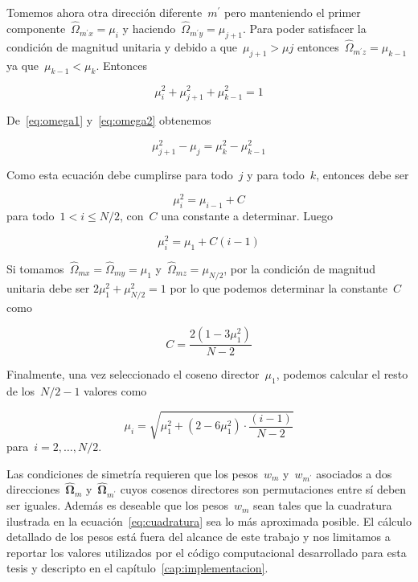 Tomemos ahora otra dirección diferente~$m^\prime$ pero manteniendo el primer componente~$\hat{\Omega}_{m^\prime x} = \mu_i$ y haciendo~$\hat{\Omega}_{m^\prime y} = \mu_{j+1}$. Para poder satisfacer la condición de magnitud unitaria y debido a que~$\mu_{j+1}>\mu{j}$ entonces~$\hat{\Omega}_{m^\prime z} = \mu_{k-1}$ ya que~$\mu_{k-1}<\mu_k$. Entonces

\begin{equation}\label{eq:omega2}
 \mu_i^2 + \mu_{j+1}^2 + \mu_{k-1}^2 = 1
\end{equation}

De~\eqref{eq:omega1} y~\eqref{eq:omega2} obtenemos

\begin{equation*}
 \mu_{j+1}^2 - \mu_{j} = \mu_{k}^2 - \mu_{k-1}^2
\end{equation*}

Como esta ecuación debe cumplirse para todo~$j$ y para todo~$k$, entonces debe ser

\begin{equation*}
 \mu_i^2 = \mu_{i-1} + C
\end{equation*}
%
para todo~$1 < i \leq N/2$, con~$C$ una constante a determinar. Luego

\begin{equation*}
 \mu_i^2 = \mu_{1} + C(i-1)
\end{equation*}

Si tomamos~$\hat{\Omega}_{mx} = \hat{\Omega}_{my} = \mu_1$ y~$\hat{\Omega}_{mz}=\mu_{N/2}$, por la condición de magnitud unitaria debe ser $2\mu_1^2 + \mu_{N/2}^2 = 1$ por lo que podemos determinar la constante~$C$ como

\begin{equation*}
 C = \frac{2 (1 - 3\mu_1^2)}{N-2}
\end{equation*}

Finalmente, una vez seleccionado el coseno director~$\mu_1$, podemos calcular el resto de los~$N/2-1$ valores como

\begin{equation}\label{eq:cosenos}
 \mu_{i} = \sqrt{\mu_1^2 + (2 - 6\mu_1^2) \cdot \frac{(i-1)}{N-2}}
\end{equation}
%
para~$i=2,\dots,N/2$.

\medskip

Las condiciones de simetría requieren que los pesos~$w_m$ y~$w_{m^\prime}$ asociados a dos direcciones~$\boldsymbol{\hat\Omega}_m$ y~$\boldsymbol{\hat\Omega}_{m^\prime}$ cuyos cosenos directores son permutaciones entre sí deben ser iguales. Además es deseable que los pesos~$w_m$ sean tales que la cuadratura ilustrada en la ecuación~\eqref{eq:cuadratura} sea lo más aproximada posible. El cálculo detallado de los pesos está fuera del alcance de este trabajo y nos limitamos a reportar los valores utilizados por el código computacional desarrollado para esta tesis y descripto en el capítulo~\ref{cap:implementacion}.


